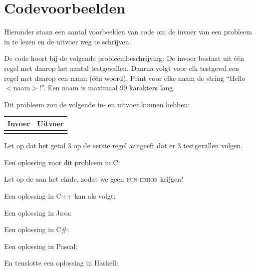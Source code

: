 \newpage
\appendix

\section{Codevoorbeelden}\label{codeexamples}

Hieronder staan een aantal voorbeelden van code om de invoer van een
probleem in te lezen en de uitvoer weg te schrijven.

De code hoort bij de volgende probleembeschrijving:
De invoer bestaat uit \'e\'en regel met daarop het aantal testgevallen.
Daarna volgt voor elk testgeval een regel met daarop een naam (\'e\'en
woord). Print voor elke naam de string ``Hello $<$naam$>$!''. Een naam
is maximaal 99 karakters lang.

Dit probleem zou de volgende in- en uitvoer kunnen hebben:

\begin{tabular}{|p{}|p{}|}
\hline
\textbf{Invoer} & \textbf{Uitvoer} \\
\hline
 &
 \\
\hline
\end{tabular}

Let op dat het getal 3 op de eerste regel aangeeft dat er 3
testgevallen volgen.

Een oplossing voor dit probleem in C:

Let op de  aan het einde, zodat we geen
\textsc{run-error} krijgen!

\newpage

Een oplossing in C++ kan als volgt:

Een oplossing in Java:

\newpage

Een oplossing in C\#:

Een oplossing in Pascal:

En tenslotte een oplossing in Haskell:


